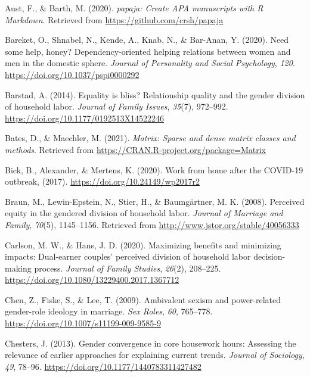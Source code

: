\documentclass[
  man]{apa6}
\newlength{\cslhangindent}
\newlength{\cslentryspacingunit} %
\newenvironment{CSLReferences}[2] %
 {%
  \setlength{\parindent}{0pt}
  \ifodd #1
  \let\oldpar\par
  \def\par{\hangindent=\cslhangindent\oldpar}
  \fi
  \setlength{\parskip}{#2\cslentryspacingunit}
 }%
 {}
\begin{document}
\hypertarget{refs}{}
\begin{CSLReferences}{1}{0}
\leavevmode{}%
Aust, F., \& Barth, M. (2020). \emph{{papaja}: {Create} {APA} manuscripts with {R Markdown}}. Retrieved from \url{https://github.com/crsh/papaja}

\leavevmode{}%
Bareket, O., Shnabel, N., Kende, A., Knab, N., \& Bar-Anan, Y. (2020). Need some help, honey? Dependency-oriented helping relations between women and men in the domestic sphere. \emph{Journal of Personality and Social Psychology}, \emph{120}. \url{https://doi.org/10.1037/pspi0000292}

\leavevmode{}%
Barstad, A. (2014). Equality is bliss? Relationship quality and the gender division of household labor. \emph{Journal of Family Issues}, \emph{35}(7), 972--992. \url{https://doi.org/10.1177/0192513X14522246}

\leavevmode{}%
Bates, D., \& Maechler, M. (2021). \emph{Matrix: Sparse and dense matrix classes and methods}. Retrieved from \url{https://CRAN.R-project.org/package=Matrix}

\leavevmode{}%
Bick, B., Alexander, \& Mertens, K. (2020). Work from home after the COVID-19 outbreak, (2017). \url{https://doi.org/10.24149/wp2017r2}

\leavevmode{}%
Braun, M., Lewin-Epstein, N., Stier, H., \& Baumgärtner, M. K. (2008). Perceived equity in the gendered division of household labor. \emph{Journal of Marriage and Family}, \emph{70}(5), 1145--1156. Retrieved from \url{http://www.jstor.org/stable/40056333}

\leavevmode{}%
Carlson, M. W., \& Hans, J. D. (2020). Maximizing benefits and minimizing impacts: Dual-earner couples' perceived division of household labor decision-making process. \emph{Journal of Family Studies}, \emph{26}(2), 208--225. \url{https://doi.org/10.1080/13229400.2017.1367712}

\leavevmode{}%
Chen, Z., Fiske, S., \& Lee, T. (2009). Ambivalent sexism and power-related gender-role ideology in marriage. \emph{Sex Roles}, \emph{60}, 765--778. \url{https://doi.org/10.1007/s11199-009-9585-9}

\leavevmode{}%
Chesters, J. (2013). Gender convergence in core housework hours: Assessing the relevance of earlier approaches for explaining current trends. \emph{Journal of Sociology}, \emph{49}, 78--96. \url{https://doi.org/10.1177/1440783311427482}


\end{CSLReferences}
\end{document}
